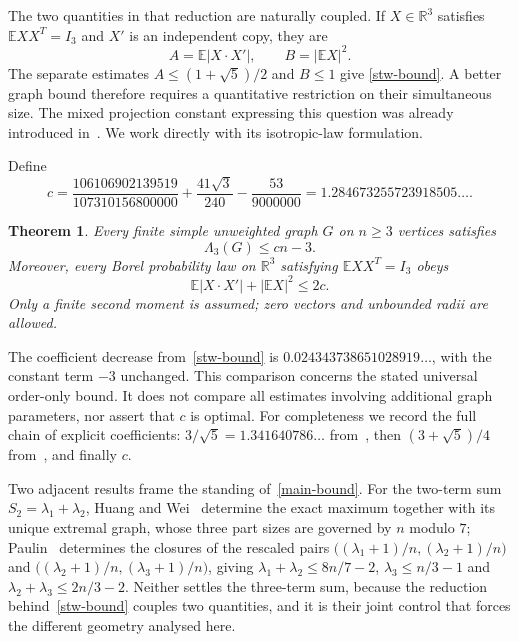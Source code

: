 \documentclass[11pt]{article}
\newtheorem{theorem}{Theorem}[section]
\theoremstyle{remark}\newtheorem{remark}[theorem]{Remark}
\newcommand{\E}{\mathbb E}
\newcommand{\R}{\mathbb R}
\numberwithin{equation}{section}
\begin{document}
The two quantities in that reduction are naturally coupled. If
$X\in\R^3$ satisfies $\E XX^T=I_3$ and $X'$ is an independent copy, they are
\[
 A=\E|X\cdot X'|,\qquad B=|\E X|^2.
\]
The separate estimates $A\le(1+\sqrt5)/2$ and $B\le1$ give
\eqref{stw-bound}. A better graph bound therefore requires a quantitative
restriction on their simultaneous size. The mixed projection constant
expressing this question was already introduced in~\cite[Section 6.2]{STW}.
We work directly with its isotropic-law formulation.

Define
\begin{equation}\label{main-constant}
 c=\frac{106106902139519}{107310156800000}
       +\frac{41\sqrt3}{240}-\frac{53}{9000000}
   =1.284673255723918505\ldots.
\end{equation}
\begin{theorem}\label{main}
Every finite simple unweighted graph $G$ on $n\ge3$ vertices satisfies
\begin{equation}\label{main-bound}
 \Lambda_3(G)\le cn-3.
\end{equation}
Moreover, every Borel probability law on $\R^3$ satisfying
$\E XX^T=I_3$ obeys
\begin{equation}\label{law-bound}
 \E|X\cdot X'|+|\E X|^2\le2c.
\end{equation}
Only a finite second moment is assumed; zero vectors and unbounded radii
are allowed.
\end{theorem}
The coefficient decrease from~\eqref{stw-bound} is
$0.024343738651028919\ldots$, with the constant term $-3$ unchanged.
This comparison concerns the stated universal order-only bound. It does
not compare all estimates involving additional graph parameters, nor
assert that $c$ is optimal. For completeness we record the full chain of
explicit coefficients: $3/\sqrt5=1.341640786\ldots$
from~\cite[Theorem~3.4.1]{Ebrahimi}, then $(3+\sqrt5)/4$
from~\cite[Proposition~6.1]{STW}, and finally $c$.

Two adjacent results frame the standing of~\eqref{main-bound}. For the
two-term sum $S_2=\lambda_1+\lambda_2$, Huang and Wei~\cite{HW} determine
the exact maximum together with its unique extremal graph, whose three part
sizes are governed by $n$ modulo $7$; Paulin~\cite{Paulin} determines the
closures of the rescaled pairs
$\bigl((\lambda_1+1)/n,(\lambda_2+1)/n\bigr)$ and
$\bigl((\lambda_2+1)/n,(\lambda_3+1)/n\bigr)$, giving
$\lambda_1+\lambda_2\le8n/7-2$, $\lambda_3\le n/3-1$ and
$\lambda_2+\lambda_3\le2n/3-2$. Neither settles the three-term sum, because
the reduction behind~\eqref{stw-bound} couples two quantities, and it is
their joint control that forces the different geometry analysed here.
\end{document}

